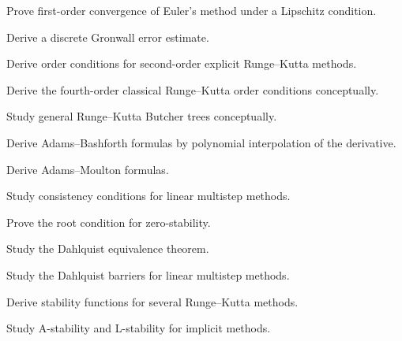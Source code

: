 \begin{exercise}[4]
Prove first-order convergence of Euler's method under a Lipschitz
condition.
\end{exercise}

\begin{exercise}[4]
Derive a discrete Gronwall error estimate.
\end{exercise}

\begin{exercise}[4]
Derive order conditions for second-order explicit Runge--Kutta methods.
\end{exercise}

\begin{exercise}[4]
Derive the fourth-order classical Runge--Kutta order conditions
conceptually.
\end{exercise}

\begin{exercise}[4]
Study general Runge--Kutta Butcher trees conceptually.
\end{exercise}

\begin{exercise}[4]
Derive Adams--Bashforth formulas by polynomial interpolation of the
derivative.
\end{exercise}

\begin{exercise}[4]
Derive Adams--Moulton formulas.
\end{exercise}

\begin{exercise}[4]
Study consistency conditions for linear multistep methods.
\end{exercise}

\begin{exercise}[4]
Prove the root condition for zero-stability.
\end{exercise}

\begin{exercise}[4]
Study the Dahlquist equivalence theorem.
\end{exercise}

\begin{exercise}[4]
Study the Dahlquist barriers for linear multistep methods.
\end{exercise}

\begin{exercise}[4]
Derive stability functions for several Runge--Kutta methods.
\end{exercise}

\begin{exercise}[4]
Study A-stability and L-stability for implicit methods.
\end{exercise}

